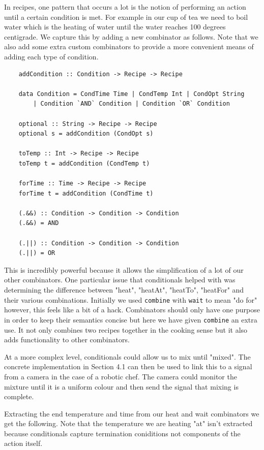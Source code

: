 \documentclass[11pt]{article}
\begin{document}
In recipes, one pattern that occurs a lot is the notion of performing an action until
a certain condition is met. For example in our cup of tea we need to boil water which is
the heating of water until the water reaches 100 degrees centigrade. We capture this by adding a new
combinator as follows. Note that we also add some extra custom combinators to provide
a more convenient means of adding each type of condition.

\begin{lstlisting}
    addCondition :: Condition -> Recipe -> Recipe

    data Condition = CondTime Time | CondTemp Int | CondOpt String
        | Condition `AND` Condition | Condition `OR` Condition

    optional :: String -> Recipe -> Recipe
    optional s = addCondition (CondOpt s)

    toTemp :: Int -> Recipe -> Recipe
    toTemp t = addCondition (CondTemp t)

    forTime :: Time -> Recipe -> Recipe
    forTime t = addCondition (CondTime t)

    (.&&) :: Condition -> Condition -> Condition
    (.&&) = AND

    (.||) :: Condition -> Condition -> Condition
    (.||) = OR
\end{lstlisting}

This is incredibly powerful because it allows the simplification of a lot of our other
combinators. One particular issue that conditionals helped with was determining the
difference between "heat", "heatAt", "heatTo", "heatFor" and their various combinations.
Initially we used \texttt{combine} with \texttt{wait} to mean "do for" however, this
feels like a bit of a hack. Combinators should only have one purpose in order to keep
their semantics concise but here we have given \texttt{combine} an extra use. It not
only combines two recipes together in the cooking sense but it also adds functionality
to other combinators.

\medbreak

At a more complex level, conditionals could allow us to mix until "mixed".
The concrete implementation in Section 4.1 can then be used to link this to a signal
from a camera in the case of a robotic chef. The camera could monitor the mixture
until it is a uniform colour and then send the signal that mixing is complete.

\medbreak

Extracting the end temperature and time from our heat and wait combinators we get the
following. Note that the temperature we are heating "at" isn't extracted because
conditionals capture termination coniditions not components of the action itself.
\end{document}
